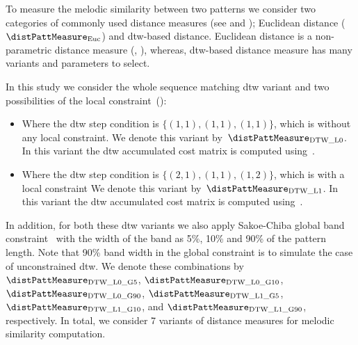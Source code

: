 To measure the melodic similarity between two patterns we consider two categories of commonly used distance measures (see  and ); Euclidean distance ($\distPattMeasure_{\mathrm{Euc}}$) and \acrfull{dtw}-based distance. Euclidean distance is a non-parametric distance measure (, ), whereas, \gls{dtw}-based distance measure has many variants and parameters to select. 

In this study we consider the whole sequence matching \gls{dtw} variant and two possibilities of the local constraint~():

\begin{itemize}
	\item  Where the \gls{dtw} step condition is $\lbrace(1,1), (1,1), (1,1)\rbrace$, which is without any local constraint. We denote this variant by~$\distPattMeasure_{\mathrm{DTW\_L0}}$. In this variant the \gls{dtw} accumulated cost matrix is computed using~.
	\item Where the \gls{dtw} step condition is $\lbrace(2,1), (1,1), (1,2)\rbrace$, which is with a local constraint We denote this variant by~$\distPattMeasure_{\mathrm{DTW\_L1}}$. In this variant the \gls{dtw} accumulated cost matrix is computed using~.
\end{itemize}

In addition, for both these \gls{dtw} variants we also apply Sakoe-Chiba global band constraint~\citep{Sakoe78TASLP} with the width of the band as 5\%, 10\% and 90\% of the pattern length. Note that 90\% band width in the global constraint is to simulate the case of unconstrained \gls{dtw}. We denote these combinations by $\distPattMeasure_{\mathrm{DTW\_L0\_G5}}$, $\distPattMeasure_{\mathrm{DTW\_L0\_G10}}$, $\distPattMeasure_{\mathrm{DTW\_L0\_G90}}$, $\distPattMeasure_{\mathrm{DTW\_L1\_G5}}$, $\distPattMeasure_{\mathrm{DTW\_L1\_G10}}$, and $\distPattMeasure_{\mathrm{DTW\_L1\_G90}}$, respectively. In total, we consider 7 variants of distance measures for melodic similarity computation.


